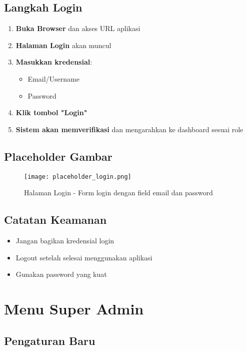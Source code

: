\documentclass[12pt,a4paper]{article}
\begin{document}
\subsection{Langkah Login}
\begin{enumerate}
    \item \textbf{Buka Browser} dan akses URL aplikasi
    \item \textbf{Halaman Login} akan muncul
    \item \textbf{Masukkan kredensial}:
    \begin{itemize}
        \item Email/Username
        \item Password
    \end{itemize}
    \item \textbf{Klik tombol "Login"}
    \item \textbf{Sistem akan memverifikasi} dan mengarahkan ke dashboard sesuai role
\end{enumerate}

\subsection{Placeholder Gambar}
\begin{figure}[H]
    \centering
    \texttt{[image: placeholder\_login.png]}
    \caption{Halaman Login - Form login dengan field email dan password}
    \label{fig:login}
\end{figure}

\subsection{Catatan Keamanan}
\begin{itemize}
    \item Jangan bagikan kredensial login
    \item Logout setelah selesai menggunakan aplikasi
    \item Gunakan password yang kuat
\end{itemize}

\newpage

\section{Menu Super Admin}

\subsection{Pengaturan Baru}
\end{document}
